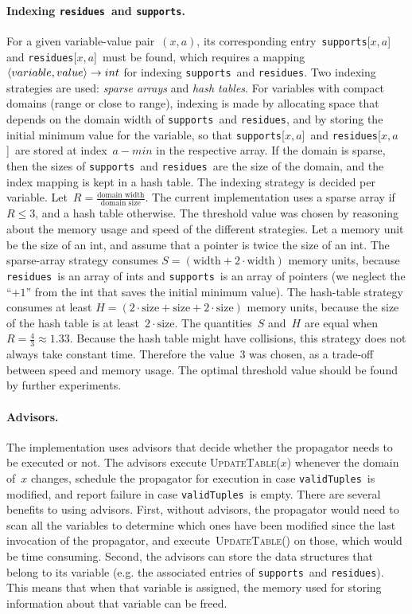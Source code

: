 \documentclass[a4paper,11pt]{article}
\theoremstyle{definition}
\newcommand{\CurrTable}{\texttt{validTuples}}
\newcommand{\Supports}{\texttt{supports}}
\newcommand{\Residues}{\texttt{residues}}
\def\UpdateTable{\textsc{Update\-Table}}
\numberwithin{equation}{section}
\begin{document}
\begin{sloppypar}
  \paragraph{Indexing \Residues~and \Supports.}
For a given variable-value pair~$(x,a)$, its corresponding entry~\Supports[$x,a$]
and \Residues[$x,a$]~must be found, which requires a mapping
$\left\langle variable,value\right\rangle \to int$ for indexing \Supports~and \Residues.
Two indexing strategies are used: \emph{sparse arrays} and \emph{hash tables}.
For variables with compact domains (range or close to range),
indexing is made by allocating space that depends on the domain width of
\Supports~and \Residues, and by storing the initial minimum value for the variable,
so that \Supports[$x,a$]~and \Residues[$x,a$]~are stored at index~$a - min$ in
the respective array. If the domain is sparse,
then the sizes of \Supports~and \Residues~are the size of the domain, and the index mapping
is kept in a hash table.
The indexing strategy is decided per variable.
Let~$R = \frac{\text{domain width}}{\text{domain size}}$.
The current implementation uses a sparse array if~$R \leq 3$, and a hash table
otherwise.
The threshold value was chosen by reasoning about the memory usage and speed
of the different strategies.
Let a memory unit be the size of an int, and assume that a pointer is twice
the size of an int. The sparse-array
strategy consumes $S = (\text{width} + 2 \cdot \text{width})$ memory units,
because \Residues~is an array of ints and \Supports~is an array of pointers
(we neglect the ``$+1$'' from the int that saves the initial minimum value).
The hash-table strategy consumes at least
$H = (2 \cdot \text{size} + \text{size} + 2 \cdot \text{size})$
memory units, because the size of the hash table
is at least~$2 \cdot \text{size}$.
The quantities~$S$ and~$H$ are equal when~$R = \frac{4}{3} \approx 1.33$.
Because the hash table might have collisions, this strategy does not always
take constant time. Therefore the value~$3$ was chosen, as a trade-off between
speed and memory usage. The optimal threshold value should be found by further
experiments.
\end{sloppypar}

\paragraph{Advisors.} The implementation uses advisors that decide whether
the propagator needs to be executed or not. The advisors execute \UpdateTable($x$)
whenever the domain of~$x$ changes, schedule the propagator for execution
in case \CurrTable~is modified, and report failure in case \CurrTable~is empty.
There are several benefits to using advisors. First, without advisors,
the propagator would need
to scan all the variables to determine which ones have been modified since the last
invocation of the propagator, and execute~\UpdateTable() on those,
which would be time consuming.
Second, the advisors can store the data structures that belong to its
variable (e.g. the associated entries of \Supports~and \Residues).
This means that when that variable is assigned, the memory used for storing
information about that variable can be freed.
\end{document}

